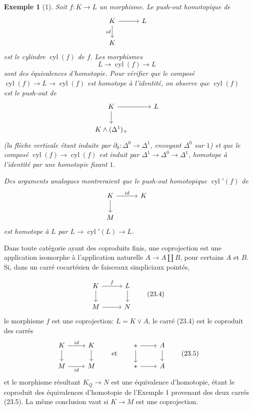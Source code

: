 \documentclass[11pt]{article}
\newcommand{\pt}{*}
\theoremstyle{deligne}
\newtheorem*{example*}{Exemple}
\newcommand{\heading}[1]{\vspace{0.7em}\noindent{\bfseries #1}\quad}
\begin{document}
\begin{example*}[1]
Soit \(f:K\to L\) un morphisme. Le push-out homotopique de
\[
\begin{tikzcd}[column sep=3.0em,row sep=1.8em]
K \arrow[r] \arrow[d,"{id}"'] & L \\
K
\end{tikzcd}
\]
est le cylindre \(\operatorname{cyl}(f)\) de \(f\). Les morphismes
\[
L\longrightarrow\operatorname{cyl}(f)\longrightarrow L
\]
sont des équivalences d'homotopie. Pour vérifier que le composé \(\operatorname{cyl}(f)\to L\to\operatorname{cyl}(f)\) est homotope à l'identité, on observe que \(\operatorname{cyl}(f)\) est le push-out de
\[
\begin{tikzcd}[column sep=3.0em,row sep=1.8em]
K \arrow[r] \arrow[d] & L \\
K\wedge(\Delta^1)_+
\end{tikzcd}
\]
(la flèche verticale étant induite par \(\partial_0:\Delta^0\to\Delta^1\), envoyant \(\Delta^0\) sur \(1\)) et que le composé \(\operatorname{cyl}(f)\to\operatorname{cyl}(f)\) est induit par \(\Delta^1\to\Delta^0\to\Delta^1\), homotope à l'identité par une homotopie fixant \(1\).

Des arguments analogues montreraient que le push-out homotopique \(\operatorname{cyl}'(f)\) de
\[
\begin{tikzcd}[column sep=3.0em,row sep=1.8em]
K \arrow[r,"{id}"] \arrow[d] & K \\
M
\end{tikzcd}
\]
est homotope à \(L\) par \(L\to\operatorname{cyl}'(L)\to L\).
\end{example*}

\heading{Exemple 2.} Dans toute catégorie ayant des coproduits finis, une coprojection est une application isomorphe à l'application naturelle \(A\to A\coprod B\), pour certains \(A\) et \(B\). Si, dans un carré cocartésien de faisceaux simpliciaux pointés,

\[
\begin{tikzcd}[column sep=2.8em,row sep=1.7em]
K \arrow[r,"f"] \arrow[d] & L \arrow[d] \\
M \arrow[r] & N
\end{tikzcd}
\tag{23.4}
\]
le morphisme \(f\) est une coprojection: \(L=K\vee A\), le carré (23.4) est le coproduit des carrés
\[
\begin{tikzcd}[column sep=2.4em,row sep=1.6em]
K \arrow[r,"id"] \arrow[d] & K \arrow[d] \\
M \arrow[r,"id"'] & M
\end{tikzcd}
\qquad\text{et}\qquad
\begin{tikzcd}[column sep=2.4em,row sep=1.6em]
\pt \arrow[r] \arrow[d] & A \arrow[d] \\
\pt \arrow[r] & A
\end{tikzcd}
\tag{23.5}
\]
et le morphisme résultant \(K_Q\to N\) est une équivalence d'homotopie, étant le coproduit des équivalences d'homotopie de l'Exemple 1 provenant des deux carrés (23.5). La même conclusion vaut si \(K\to M\) est une coprojection.
\end{document}
